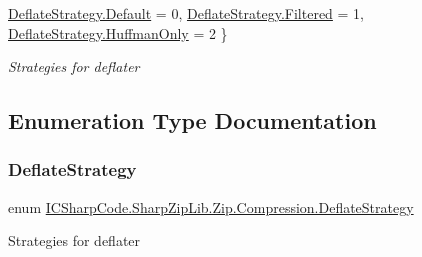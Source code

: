 \begin{DoxyCompactItemize}
\hyperlink{namespace_i_c_sharp_code_1_1_sharp_zip_lib_1_1_zip_1_1_compression_a922c175879503e6b9e35641deccfbc40a7a1920d61156abc05a60135aefe8bc67}{Deflate\+Strategy.\+Default} = 0, 
\newline
\hyperlink{namespace_i_c_sharp_code_1_1_sharp_zip_lib_1_1_zip_1_1_compression_a922c175879503e6b9e35641deccfbc40afe84ed3d6baffd193df85d308e5e908c}{Deflate\+Strategy.\+Filtered} = 1, 
\hyperlink{namespace_i_c_sharp_code_1_1_sharp_zip_lib_1_1_zip_1_1_compression_a922c175879503e6b9e35641deccfbc40ac6bfb9e3d4bc09057155cf42093806bf}{Deflate\+Strategy.\+Huffman\+Only} = 2
 \}\begin{DoxyCompactList}\small\item\em Strategies for deflater \end{DoxyCompactList}
\end{DoxyCompactItemize}


\subsection{Enumeration Type Documentation}
\mbox{\label{namespace_i_c_sharp_code_1_1_sharp_zip_lib_1_1_zip_1_1_compression_a922c175879503e6b9e35641deccfbc40}} 
\subsubsection{\texorpdfstring{Deflate\+Strategy}{DeflateStrategy}\hspace{0.1cm}{\footnotesize\ttfamily [1/2]}}
{\footnotesize\ttfamily enum \hyperlink{namespace_i_c_sharp_code_1_1_sharp_zip_lib_1_1_zip_1_1_compression_a922c175879503e6b9e35641deccfbc40}{I\+C\+Sharp\+Code.\+Sharp\+Zip\+Lib.\+Zip.\+Compression.\+Deflate\+Strategy}\hspace{0.3cm}{\ttfamily [strong]}}



Strategies for deflater 


